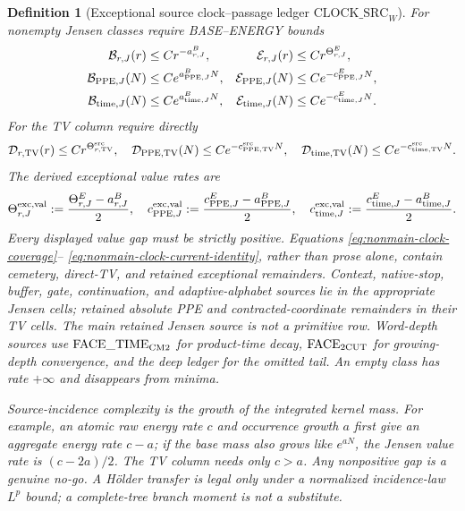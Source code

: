 \documentclass[11pt]{article}
\newtheorem{definition}[theorem]{Definition}
\begin{document}
\begin{definition}[Exceptional source clock--passage ledger
$\mathrm{CLOCK\_SRC}_{W}$]
For nonempty Jensen classes require BASE--ENERGY bounds
\begin{align}
 \mathcal B_{r,J}(r)&\le Cr^{-a_{r,J}^{B}},&
 \mathcal E_{r,J}(r)&\le Cr^{\Theta_{r,J}^{E}},\notag\\
 \mathcal B_{\mathrm{PPE},J}(N)&\le Ce^{a_{\mathrm{PPE},J}^{B}N},&
 \mathcal E_{\mathrm{PPE},J}(N)&\le Ce^{-c_{\mathrm{PPE},J}^{E}N},\notag\\
 \mathcal B_{\mathrm{time},J}(N)&\le Ce^{a_{\mathrm{time},J}^{B}N},&
 \mathcal E_{\mathrm{time},J}(N)&\le Ce^{-c_{\mathrm{time},J}^{E}N}.
 \label{eq:clock-source-matrix-tails}
\end{align}
For the TV column require directly
\begin{equation}
\label{eq:clock-source-TV-tails}
 \mathcal D_{r,\mathrm{TV}}(r)\le Cr^{\Theta_{r,\mathrm{TV}}^{\rm src}},
 \quad
 \mathcal D_{\mathrm{PPE},\mathrm{TV}}(N)
     \le Ce^{-c_{\mathrm{PPE},\mathrm{TV}}^{\rm src}N},
 \quad
 \mathcal D_{\mathrm{time},\mathrm{TV}}(N)
     \le Ce^{-c_{\mathrm{time},\mathrm{TV}}^{\rm src}N}.
\end{equation}
The derived exceptional value rates are
\begin{equation}
\label{eq:exceptional-Jensen-value-rates}
 \Theta_{r,J}^{\rm exc,val}:=
   \frac{\Theta_{r,J}^{E}-a_{r,J}^{B}}2,
 \quad
 c_{\mathrm{PPE},J}^{\rm exc,val}:=
   \frac{c_{\mathrm{PPE},J}^{E}-a_{\mathrm{PPE},J}^{B}}2,
 \quad
 c_{\mathrm{time},J}^{\rm exc,val}:=
   \frac{c_{\mathrm{time},J}^{E}-a_{\mathrm{time},J}^{B}}2.
\end{equation}
Every displayed value gap must be strictly positive.  Equations
\eqref{eq:nonmain-clock-coverage}--
\eqref{eq:nonmain-clock-current-identity}, rather than prose alone, contain
cemetery, direct-TV, and retained exceptional remainders.  Context,
native-stop, buffer, gate, continuation, and adaptive-alphabet sources lie in the
appropriate Jensen cells; retained absolute PPE and contracted-coordinate
remainders in their TV cells.  The main retained Jensen source is not a
primitive row.  Word-depth sources use
$\mathrm{FACE\_TIME}_{\rm CM2}$ for product-time decay,
$\mathrm{FACE}_{\rm 2CUT}$ for growing-depth convergence, and the deep
ledger for the omitted tail.  An empty class has rate
$+\infty$ and disappears from minima.

Source-incidence complexity is the growth of the integrated kernel mass.
For example, an atomic raw energy rate $c$ and occurrence growth $a$ first
give an aggregate energy rate $c-a$; if the base mass also grows like
$e^{aN}$, the Jensen value rate is $(c-2a)/2$.  The TV column needs only
$c>a$.  Any nonpositive gap is a genuine no-go.  A H\"older transfer is
legal only under a normalized incidence-law $L^p$ bound; a complete-tree
branch moment is not a substitute.
\end{definition}
\end{document}
